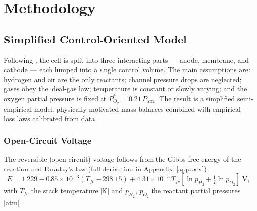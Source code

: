 
\chapter{Methodology}

\label{Chapter3}

\section{Simplified Control-Oriented Model}
\label{sec:model}

Following \cite{thanapalan2008,pukrushpan2003}, the cell is split into three
interacting parts --- anode, membrane, and cathode --- each lumped into a single
control volume. The main assumptions are: hydrogen and air are the only
reactants; channel pressure drops are neglected; gases obey the ideal-gas law;
temperature is constant or slowly varying; and the oxygen partial pressure is
fixed at $P_{O_2}^{\ast}=0.21\,P_{\mathrm{atm}}$. The result is a simplified
semi-empirical model: physically motivated mass balances combined with empirical
loss laws calibrated from data \cite{cao2019}.

\subsection{Open-Circuit Voltage}
The reversible (open-circuit) voltage follows from the Gibbs free energy of the
reaction and Faraday's law (full derivation in Appendix~\ref{app:ocv}):
\begin{equation}
    \label{eq:ocv}
    E = 1.229 - 0.85\times10^{-3}(T_{fc}-298.15)
      + 4.31\times10^{-5}\,T_{fc}\left[\ln p_{H_2} + \tfrac{1}{2}\ln p_{O_2}\right]\;\mathrm{V},
\end{equation}
with $T_{fc}$ the stack temperature [K] and $p_{H_2}$, $p_{O_2}$ the reactant
partial pressures [atm] \cite{pukrushpan2003}.

